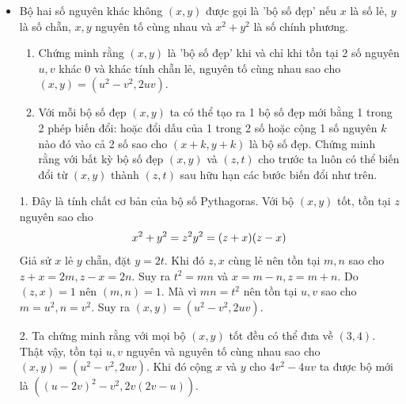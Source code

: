 \documentclass[11pt]{scrartcl}
\begin{document}
\begin{itemize}[label=, leftmargin=0em, itemsep=0.5em]
    
    \item \begin{bt}
    Bộ hai số nguyên khác không $(x, y)$ được gọi là 'bộ số đẹp' nếu $x$ là số lẻ, $y$ là số chẵn, $x, y$ nguyên tố cùng nhau và $x^2 + y^2$ là số chính phương.
    \begin{enumerate}
        \item Chứng minh rằng $(x, y)$ là 'bộ số đẹp' khi và chỉ khi tồn tại 2 số nguyên $u, v$ khác $0$ và khác tính chẵn lẻ, nguyên tố cùng nhau sao cho $(x, y) = (u^2 - v^2, 2uv)$.
        \item Với mỗi bộ số đẹp $(x, y)$ ta có thể tạo ra 1 bộ số đẹp mới bằng 1 trong 2 phép biến đổi: hoặc đổi dấu của 1 trong 2 số hoặc cộng 1 số nguyên $k$ nào đó vào cả 2 số sao cho $(x + k, y + k)$ là bộ số đẹp. Chứng minh rằng với bất kỳ bộ số đẹp $(x, y)$ và $(z, t)$ cho trước ta luôn có thể biến đổi từ $(x, y)$ thành $(z, t)$ sau hữu hạn các bước biến đổi như trên.
    \end{enumerate}
    
    \end{bt}
    \begin{sol}
        1. Đây là tính chất cơ bản của bộ số Pythagoras. Với bộ $(x,y)$ tốt, tồn tại $z$ nguyên sao cho 
        \[
            x^2 + y^2 = z^2 \lra y^2 = (z + x)(z - x)
        \]
        Giả sử $x$ lẻ $y$ chẵn, đặt $y = 2t$. Khi đó $z,x$ cùng lẻ nên tồn tại $m,n$ sao cho $z + x = 2m, z - x = 2n$. Suy ra $t^2 = mn$ và $x = m -n, z = m +n$. Do $(z,x) = 1$ nên $(m,n) = 1$. Mà vì $mn = t^2$ nên tồn tại $u,v$ sao cho $m = u^2, n = v^2$. Suy ra $(x,y) = (u^2 - v^2,2uv)$.

        2. Ta chứng minh rằng với mọi bộ $(x,y)$ tốt đều có thể đưa về $(3,4)$. Thật vậy, tồn tại $u,v$ nguyên và nguyên tố cùng nhau sao cho $(x,y) = (u^2 - v^2, 2uv)$. Khi đó cộng $x$ và $y$ cho $4v^2 - 4uv$ ta được bộ mới là $((u - 2v)^2 - v^2, 2v(2v -u ))$.


\end{sol}
\end{itemize}
\end{document}
